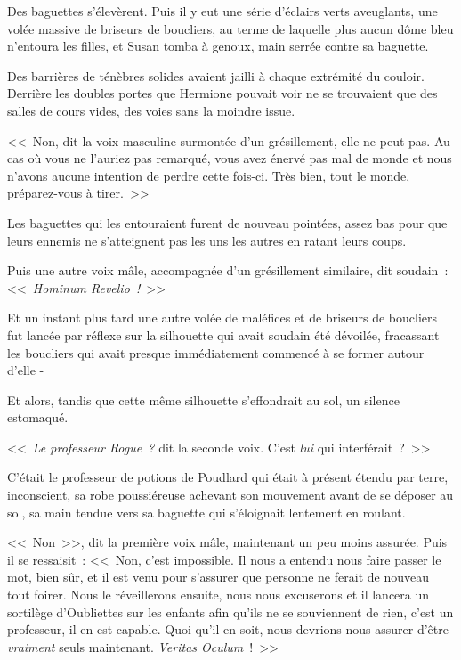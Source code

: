 Des baguettes s'élevèrent. Puis il y eut une série d'éclairs verts aveuglants, une volée massive de briseurs de boucliers, au terme de laquelle plus aucun dôme bleu n'entoura les filles, et Susan tomba à genoux, main serrée contre sa baguette.

Des barrières de ténèbres solides avaient jailli à chaque extrémité du couloir. Derrière les doubles portes que Hermione pouvait voir ne se trouvaient que des salles de cours vides, des voies sans la moindre issue.

<<~Non, dit la voix masculine surmontée d'un grésillement, elle ne peut pas. Au cas où vous ne l'auriez pas remarqué, vous avez énervé pas mal de monde et nous n'avons aucune intention de perdre cette fois-ci. Très bien, tout le monde, préparez-vous à tirer.~>>

Les baguettes qui les entouraient furent de nouveau pointées, assez bas pour que leurs ennemis ne s'atteignent pas les uns les autres en ratant leurs coups.

Puis une autre voix mâle, accompagnée d'un grésillement similaire, dit soudain~: <<~\emph{Hominum Revelio~!}~>>

Et un instant plus tard une autre volée de maléfices et de briseurs de boucliers fut lancée par réflexe sur la silhouette qui avait soudain été dévoilée, fracassant les boucliers qui avait presque immédiatement commencé à se former autour d'elle -

Et alors, tandis que cette même silhouette s'effondrait au sol, un silence estomaqué.

<<~\emph{Le professeur Rogue~?} dit la seconde voix. C'est \emph{lui} qui interférait~?~>>

C'était le professeur de potions de Poudlard qui était à présent étendu par terre, inconscient, sa robe poussiéreuse achevant son mouvement avant de se déposer au sol, sa main tendue vers sa baguette qui s'éloignait lentement en roulant.

<<~Non~>>, dit la première voix mâle, maintenant un peu moins assurée. Puis il se ressaisit~: <<~Non, c'est impossible. Il nous a entendu nous faire passer le mot, bien sûr, et il est venu pour s'assurer que personne ne ferait de nouveau tout foirer. Nous le réveillerons ensuite, nous nous excuserons et il lancera un sortilège d'Oubliettes sur les enfants afin qu'ils ne se souviennent de rien, c'est un professeur, il en est capable. Quoi qu'il en soit, nous devrions nous assurer d'être \emph{vraiment} seuls maintenant. \emph{Veritas Oculum}~!~>>


